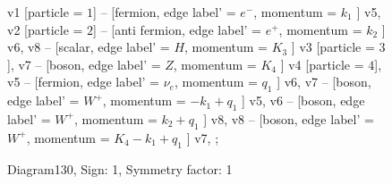 \documentclass{revtex4}
\begin{document}
\begin{figure}[!htb]
\begin{center}
{    %
v1 [particle = \(1\)] -- [fermion, edge label' = \(e^{-}\), momentum = \(k_{1}\) ] v5, 
v2 [particle = \(2\)] -- [anti fermion, edge label' = \(e^{+}\), momentum = \(k_{2}\) ] v6, 
v8 -- [scalar, edge label' = \(H\), momentum = \(K_{3}\) ] v3 [particle = \(3\)], 
v7 -- [boson, edge label' = \(Z\), momentum = \(K_{4}\) ] v4 [particle = \(4\)], 
v5 -- [fermion, edge label' = \(\nu_{e}\), momentum = \(q_{1}\) ] v6, 
v7 -- [boson, edge label' = \(W^{+}\), momentum = \(-k_{1} + q_{1}\) ] v5, 
v6 -- [boson, edge label' = \(W^{+}\), momentum = \(k_{2} + q_{1}\) ] v8, 
v8 -- [boson, edge label' = \(W^{+}\), momentum = \(K_{4} - k_{1} + q_{1}\) ] v7, 
};
\end{center}
\caption{Diagram130, Sign: 1, Symmetry factor: 1}
\end{figure}
\newpage
\end{document}
